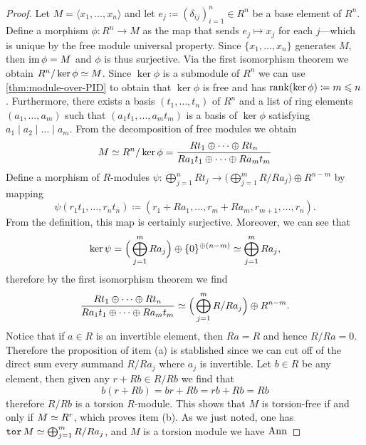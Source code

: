 \begin{proof}
    Let \(M = \langle x_1, \dots, x_n \rangle\) and let
    \(e_j \coloneq (\delta_{ij})_{i=1}^n \in R^n\) be a base element of \(R^n\). Define a morphism
    \(\phi: R^n \to M\) as the map that sends \(e_j \mapsto x_j\) for each
    \(j\)---which is unique by the free module universal property. Since
    \(\{x_1, \dots, x_n\}\) generates \(M\), then \(\operatorname{im} \phi = M\) and \(\phi\) is thus
    surjective. Via the first isomorphism theorem we obtain
    \(R^n/\ker \phi \simeq M\). Since \(\ker \phi\) is a submodule of \(R^n\) we can use
    \cref{thm:module-over-PID} to obtain that \(\ker \phi\) is free and has
    \(\operatorname{rank}(\ker \phi) \coloneq m \leqslant n\). Furthermore, there exists a basis
    \((t_1, \dots, t_n)\) of \(R^n\) and a list of ring elements
    \((a_1, \dots, a_m)\) such that \((a_1 t_1, \dots, a_m t_m)\) is a basis of
    \(\ker \phi\) satisfying \(a_1 \mid a_2 \mid \dots \mid a_m\). From the decomposition of
    free modules we obtain
    \[
        M \simeq R^n/\ker \phi =
        \frac{R t_1 \oplus \dots \oplus R t_n}{R a_1 t_1 \oplus \dots \oplus R a_m t_m}
    \]
    Define a morphism of \(R\)-modules
    \(\psi: \bigoplus_{j=1}^n R t_j \to \big( \bigoplus_{j=1}^m R/Ra_j \big) \oplus R^{n-m}\)
    by mapping
    \[
        \psi(r_1 t_1, \dots, r_n t_n) \coloneq
        (r_1 + R a_1, \dots, r_m + R a_m, r_{m+1}, \dots, r_n).
    \]
    From the definition, this map is certainly surjective. Moreover, we can see that
    \[
        \ker \psi
        = \Big( \bigoplus_{j=1}^m R a_j \Big) \oplus \{0\}^{\oplus (n-m)}
        \simeq \bigoplus_{j=1}^m R a_j,
    \]
    therefore by the first isomorphism theorem we find
    \[
        \frac{R t_1 \oplus \dots \oplus R t_n}{R a_1 t_1 \oplus \dots \oplus R a_m t_m}
        \simeq \Big( \bigoplus_{j=1}^m R/R a_j \Big) \oplus R^{n-m}.
    \]
    Notice that if \(a \in R\) is an invertible element, then \(R a = R\) and hence
    \(R/Ra = 0\). Therefore the proposition of item (a) is stablished since we can
    cut off of the direct sum every summand \(R/Ra_j\) where \(a_j\) is invertible.
    Let \(b \in R\) be any element, then given any \(r + R b \in R/Rb\) we find that
    \[
        b(r + R b) = b r + R b = r b + R b = R b
    \]
    therefore \(R/Rb\) is a torsion \(R\)-module. This shows that \(M\) is
    torsion-free if and only if \(M \simeq R^r\), which proves item (b). As we just
    noted, one has \(\operatorname{\texttt{tor}} M \simeq \bigoplus_{j=1}^m R/R a_j\), and \(M\) is a
    torsion module we have \(\operatorname{Ann}\)
\end{proof}

